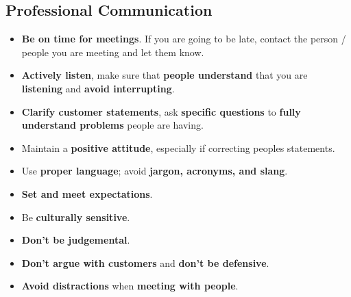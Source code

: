 \documentclass{article}
\begin{document}
    \subsection*{Professional Communication}
    \begin{itemize}
        \item \textbf{Be on time for meetings}. If you are going to be late, contact the person / people you are meeting and let them know.
        \item \textbf{Actively listen}, make sure that \textbf{people understand} that you are \textbf{listening} and \textbf{avoid interrupting}.
        \item \textbf{Clarify customer statements}, ask \textbf{specific questions} to \textbf{fully understand problems} people are having.
        \item Maintain a \textbf{positive attitude}, especially if correcting peoples statements.
        \item Use \textbf{proper language}; avoid \textbf{jargon, acronyms, and slang}.
        \item \textbf{Set and meet expectations}.
        \item Be \textbf{culturally sensitive}.
        \item \textbf{Don't be judgemental}.
        \item \textbf{Don't argue with customers} and \textbf{don't be defensive}.
        \item \textbf{Avoid distractions} when \textbf{meeting with people}.
    \end{itemize}

    
\end{document}
